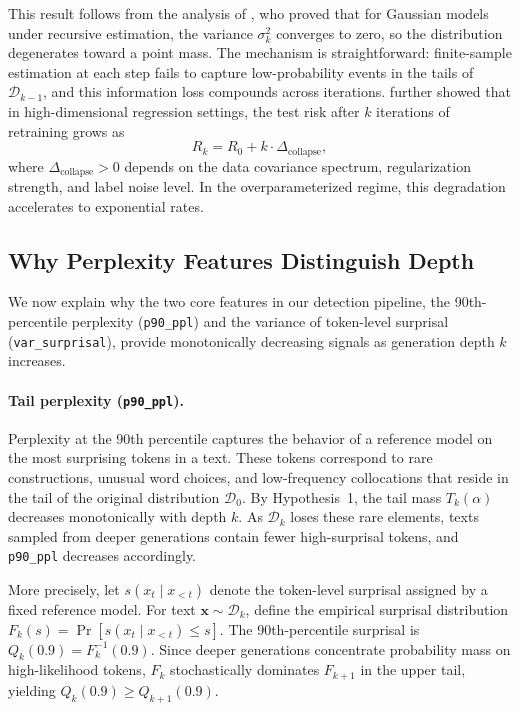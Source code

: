 This result follows from the analysis of \citet{shumailov2024_nature}, who proved that for Gaussian models under recursive estimation, the variance $\sigma_k^2$ converges to zero, so the distribution degenerates toward a point mass. The mechanism is straightforward: finite-sample estimation at each step fails to capture low-probability events in the tails of $\mathcal{D}_{k-1}$, and this information loss compounds across iterations. \citet{dohmatob2024_demystified} further showed that in high-dimensional regression settings, the test risk after $k$ iterations of retraining grows as
\begin{equation}
    R_k = R_0 + k \cdot \Delta_{\text{collapse}},
    \label{eq:linear_growth}
\end{equation}
where $\Delta_{\text{collapse}} > 0$ depends on the data covariance spectrum, regularization strength, and label noise level. In the overparameterized regime, this degradation accelerates to exponential rates.

\subsection{Why Perplexity Features Distinguish Depth}
\label{sec:theory:features}

We now explain why the two core features in our detection pipeline, the 90th-percentile perplexity (\texttt{p90\_ppl}) and the variance of token-level surprisal (\texttt{var\_surprisal}), provide monotonically decreasing signals as generation depth $k$ increases.

\paragraph{Tail perplexity (\texttt{p90\_ppl}).}
Perplexity at the 90th percentile captures the behavior of a reference model on the most surprising tokens in a text. These tokens correspond to rare constructions, unusual word choices, and low-frequency collocations that reside in the tail of the original distribution $\mathcal{D}_0$. By Hypothesis~1, the tail mass $T_k(\alpha)$ decreases monotonically with depth $k$. As $\mathcal{D}_k$ loses these rare elements, texts sampled from deeper generations contain fewer high-surprisal tokens, and \texttt{p90\_ppl} decreases accordingly.

More precisely, let $s(x_t \mid x_{<t})$ denote the token-level surprisal assigned by a fixed reference model. For text $\mathbf{x} \sim \mathcal{D}_k$, define the empirical surprisal distribution $F_k(s) = \Pr[s(x_t \mid x_{<t}) \leq s]$. The 90th-percentile surprisal is $Q_k(0.9) = F_k^{-1}(0.9)$. Since deeper generations concentrate probability mass on high-likelihood tokens, $F_k$ stochastically dominates $F_{k+1}$ in the upper tail, yielding $Q_k(0.9) \geq Q_{k+1}(0.9)$.


